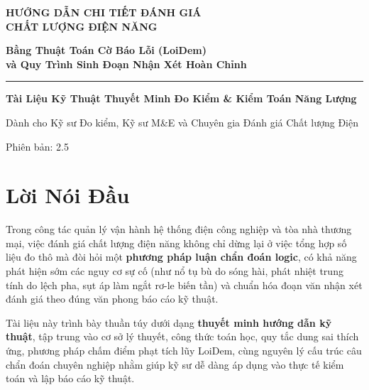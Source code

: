 \documentclass[12pt,a4paper]{article}
\begin{document}
\hypersetup{pageanchor=false}
\begin{titlepage}
  \centering
  \vspace*{2.5cm}
  {\sffamily\bfseries\color{primary}\Huge
  HƯỚNG DẪN CHI TIẾT ĐÁNH GIÁ\\[0.3em]
  CHẤT LƯỢNG ĐIỆN NĂNG\par}
  \vspace{1.0cm}
  {\sffamily\Large\bfseries Bằng Thuật Toán Cờ Báo Lỗi (LoiDem)\\[0.35em]
  và Quy Trình Sinh Đoạn Nhận Xét Hoàn Chỉnh\par}
  \vspace{0.8cm}
  \rule{0.6\textwidth}{1.5pt}
  \vspace{1.2cm}

  {\large\sffamily\bfseries Tài Liệu Kỹ Thuật Thuyết Minh Đo Kiểm \& Kiểm Toán Năng Lượng\par}
  \vspace{0.5cm}
  {\small Dành cho Kỹ sư Đo kiểm, Kỹ sư M\&E và Chuyên gia Đánh giá Chất lượng Điện\par}

  \vfill
  {\sffamily\small Phiên bản: 2.5\par}
  \vspace*{1.5cm}
\end{titlepage}
\hypersetup{pageanchor=true}

\tableofcontents
\clearpage

\section*{Lời Nói Đầu}

Trong công tác quản lý vận hành hệ thống điện công nghiệp và tòa nhà thương mại, việc đánh giá chất lượng điện năng không chỉ dừng lại ở việc tổng hợp số liệu đo thô mà đòi hỏi một \textbf{phương pháp luận chẩn đoán logic}, có khả năng phát hiện sớm các nguy cơ sự cố (như nổ tụ bù do sóng hài, phát nhiệt trung tính do lệch pha, sụt áp làm ngắt rơ-le biến tần) và chuẩn hóa đoạn văn nhận xét đánh giá theo đúng văn phong báo cáo kỹ thuật.

Tài liệu này trình bày thuần túy dưới dạng \textbf{thuyết minh hướng dẫn kỹ thuật}, tập trung vào cơ sở lý thuyết, công thức toán học, quy tắc dung sai thích ứng, phương pháp chấm điểm phạt tích lũy LoiDem, cùng nguyên lý cấu trúc câu chẩn đoán chuyên nghiệp nhằm giúp kỹ sư dễ dàng áp dụng vào thực tế kiểm toán và lập báo cáo kỹ thuật.
\end{document}

